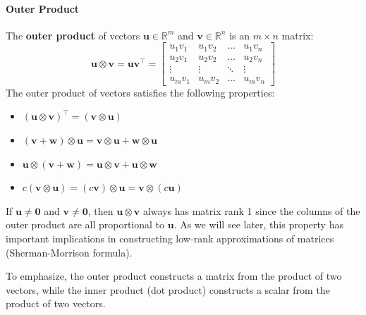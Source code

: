 \paragraph*{Outer Product}
The \textbf{outer product} of vectors $ \mathbf{u} \in \mathbb{R}^m $ and $ \mathbf{v} \in \mathbb{R}^n $ is an $ m \times n $ matrix:
\begin{equation*}
    \mathbf{u}\otimes\mathbf{v} = \mathbf{u} \mathbf{v}^\top = \begin{bmatrix} u_1 v_1 & u_1 v_2 & \ldots & u_1 v_n \\ u_2 v_1 & u_2 v_2 & \ldots & u_2 v_n \\ \vdots & \vdots & \ddots & \vdots \\ u_m v_1 & u_m v_2 & \ldots & u_m v_n \end{bmatrix}
\end{equation*}
The outer product of vectors satisfies the following properties:
\begin{itemize}
    \item $ (\mathbf{u} \otimes \mathbf{v})^\top = (\mathbf{v} \otimes \mathbf{u}) $
    \item $ (\mathbf{v} + \mathbf{w}) \otimes \mathbf{u} = \mathbf{v} \otimes \mathbf{u} + \mathbf{w} \otimes \mathbf{u} $
    \item $ \mathbf{u} \otimes (\mathbf{v} + \mathbf{w}) = \mathbf{u} \otimes \mathbf{v} + \mathbf{u} \otimes \mathbf{w} $
    \item $ c (\mathbf{v} \otimes \mathbf{u}) = (c \mathbf{v}) \otimes \mathbf{u} = \mathbf{v} \otimes (c \mathbf{u}) $
\end{itemize}
If $\mathbf{u} \neq \mathbf{0}$ and $\mathbf{v} \neq \mathbf{0}$, then $\mathbf{u} \otimes \mathbf{v}$ always has matrix rank 1 since the columns of the outer product are all proportional to $\mathbf{u}$. As we will see later, this property has important implications in constructing low-rank approximations of matrices (Sherman-Morrison formula).

To emphasize, the outer product constructs a matrix from the product of two vectors, while the inner product (dot product) constructs a scalar from the product of two vectors.

